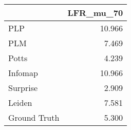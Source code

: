 \begin{tabular}{lr}
\toprule
{} & LFR_mu_70 \\
\midrule
PLP          &    10.966 \\
PLM          &     7.469 \\
Potts        &     4.239 \\
Infomap      &    10.966 \\
Surprise     &     2.909 \\
Leiden       &     7.581 \\
Ground Truth &     5.300 \\
\bottomrule
\end{tabular}
